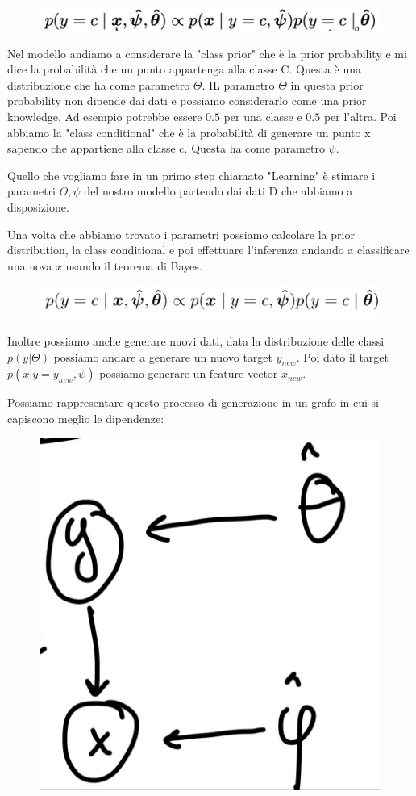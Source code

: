 \documentclass[14pt]{extreport}
\begin{document}
\begin{figure}[H]
\centering
\includegraphics[width=0.7\linewidth]{201.jpeg}
\end{figure}

Nel modello andiamo a considerare la "class prior" che è la prior probability e mi dice la probabilità che un punto appartenga alla classe C. Questa è
una distribuzione che ha come parametro $\Theta$. IL parametro $\Theta$ in questa prior probability non dipende dai dati e possiamo considerarlo come
una prior knowledge. Ad esempio potrebbe essere $0.5$ per una classe e $0.5$ per l'altra. Poi abbiamo la "class conditional" che è la probabilità di
generare un punto x sapendo che appartiene alla classe c. Questa ha come parametro $\psi$.

Quello che vogliamo fare in un primo step chiamato "Learning" è stimare i parametri ${\Theta, \psi}$ del nostro modello partendo dai dati D che
abbiamo a disposizione.

Una volta che abbiamo trovato i parametri possiamo calcolare la prior distribution, la class conditional e poi effettuare l'inferenza andando a
classificare una uova $x$ usando il teorema di Bayes.
\begin{figure}[H]
\centering
\includegraphics[width=0.7\linewidth]{159.jpeg}
\end{figure}

Inoltre possiamo anche generare nuovi dati, data la distribuzione delle classi $p(y|\Theta)$ possiamo andare a generare un nuovo target $y_{new}$. Poi
dato il target $p(x|y=y_{new}, \psi)$ possiamo generare un feature vector $x_{new}$.

Possiamo rappresentare questo processo di generazione in un grafo in cui si capiscono meglio le dipendenze:

\begin{figure}[H]
\centering
\includegraphics[width=0.2\linewidth]{160.jpeg}
\end{figure}
\end{document}
